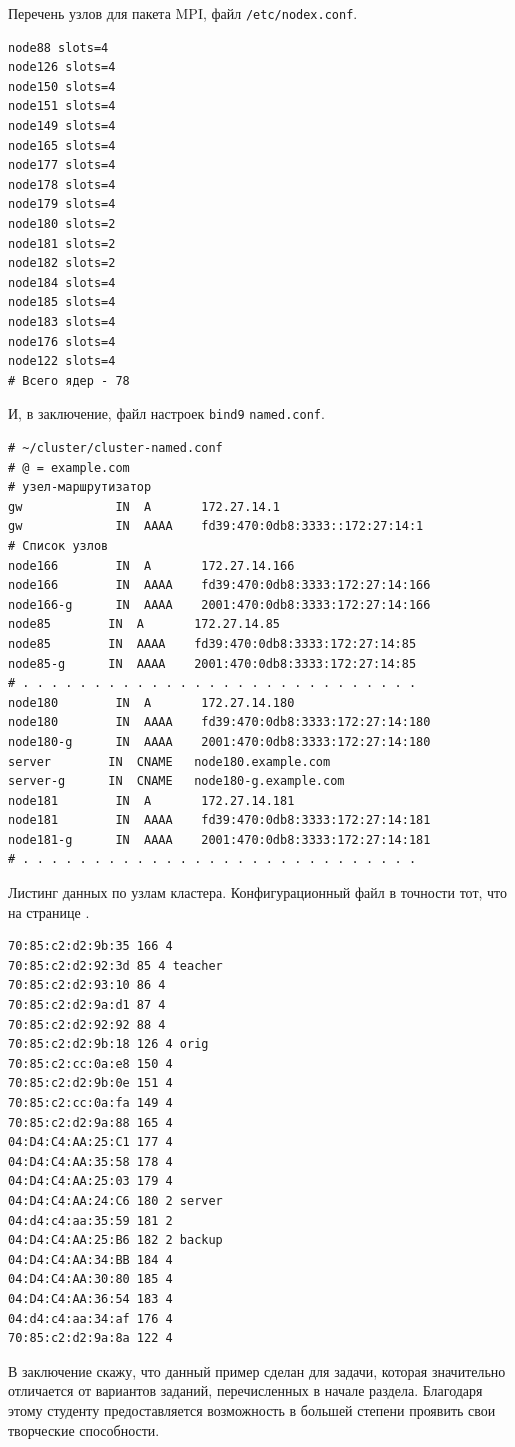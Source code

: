 \documentclass[a4paper,12pt,final,openany]{extbook}
\begin{document}
Перечень узлов для пакета MPI, файл \texttt{/etc/nodex.conf}.
\begin{verbatim}
node88 slots=4
node126 slots=4
node150 slots=4
node151 slots=4
node149 slots=4
node165 slots=4
node177 slots=4
node178 slots=4
node179 slots=4
node180 slots=2
node181 slots=2
node182 slots=2
node184 slots=4
node185 slots=4
node183 slots=4
node176 slots=4
node122 slots=4
# Всего ядер - 78
\end{verbatim}

И, в заключение, файл настроек \texttt{bind9} \texttt{named.conf}.
\begin{verbatim}
# ~/cluster/cluster-named.conf
# @ = example.com
# узел-маршрутизатор
gw             IN  A       172.27.14.1
gw             IN  AAAA    fd39:470:0db8:3333::172:27:14:1
# Список узлов
node166        IN  A       172.27.14.166
node166        IN  AAAA    fd39:470:0db8:3333:172:27:14:166
node166-g      IN  AAAA    2001:470:0db8:3333:172:27:14:166
node85        IN  A       172.27.14.85
node85        IN  AAAA    fd39:470:0db8:3333:172:27:14:85
node85-g      IN  AAAA    2001:470:0db8:3333:172:27:14:85
# . . . . . . . . . . . . . . . . . . . . . . . . . . . .
node180        IN  A       172.27.14.180
node180        IN  AAAA    fd39:470:0db8:3333:172:27:14:180
node180-g      IN  AAAA    2001:470:0db8:3333:172:27:14:180
server        IN  CNAME   node180.example.com
server-g      IN  CNAME   node180-g.example.com
node181        IN  A       172.27.14.181
node181        IN  AAAA    fd39:470:0db8:3333:172:27:14:181
node181-g      IN  AAAA    2001:470:0db8:3333:172:27:14:181
# . . . . . . . . . . . . . . . . . . . . . . . . . . . .
\end{verbatim}

Листинг данных по узлам кластера. Конфигурационный файл в точности тот, что на странице \pageref{conforig}.
\begin{verbatim}
70:85:c2:d2:9b:35 166 4
70:85:c2:d2:92:3d 85 4 teacher
70:85:c2:d2:93:10 86 4
70:85:c2:d2:9a:d1 87 4
70:85:c2:d2:92:92 88 4
70:85:c2:d2:9b:18 126 4 orig
70:85:c2:cc:0a:e8 150 4
70:85:c2:d2:9b:0e 151 4
70:85:c2:cc:0a:fa 149 4
70:85:c2:d2:9a:88 165 4
04:D4:C4:AA:25:C1 177 4
04:D4:C4:AA:35:58 178 4
04:D4:C4:AA:25:03 179 4
04:D4:C4:AA:24:C6 180 2 server
04:d4:c4:aa:35:59 181 2
04:D4:C4:AA:25:B6 182 2 backup
04:D4:C4:AA:34:BB 184 4
04:D4:C4:AA:30:80 185 4
04:D4:C4:AA:36:54 183 4
04:d4:c4:aa:34:af 176 4
70:85:c2:d2:9a:8a 122 4
\end{verbatim}

В заключение скажу, что данный пример сделан для задачи, которая значительно отличается от вариантов заданий, перечисленных в начале раздела. Благодаря этому студенту предоставляется возможность в большей степени проявить свои творческие способности.
\end{document}
